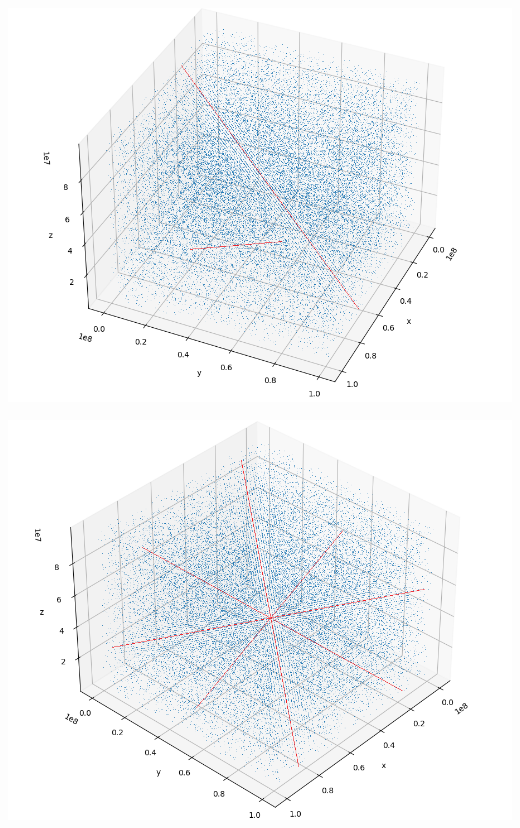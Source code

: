 \documentclass[showpacs, oneside, onecolumn, prl, amsmath, amssymb, nofootinbib, superscriptaddress, notitlepage]{revtex4-1}
\begin{document}
	\subfigure
	{\begin{minipage}[b]{0.39\textwidth}
	\includegraphics[scale=0.4]{6-1-3.png}
	\end{minipage}}
	\subfigure
	{\begin{minipage}[b]{0.39\textwidth}
	\includegraphics[scale=0.4]{6-1-4.png}
	\end{minipage}}
	\subfigure
\end{document}
